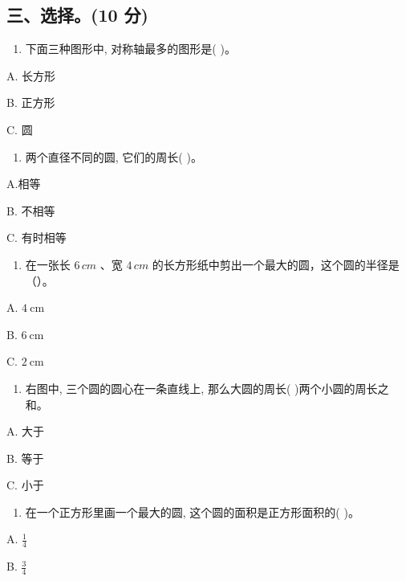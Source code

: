 \documentclass[
  10
]{article}
\providecommand{\tightlist}{%
  \setlength{\itemsep}{0pt}\setlength{\parskip}{0pt}}
\begin{document}
\subsection{三、选择。(10 分)}\label{ux4e09ux9009ux62e910-ux5206}

\begin{enumerate}
\def\labelenumi{\arabic{enumi}.}
\tightlist
\item
  下面三种图形中, 对称轴最多的图形是( )。
\end{enumerate}

A. 长方形

B. 正方形

C. 圆

\begin{enumerate}
\def\labelenumi{\arabic{enumi}.}
\setcounter{enumi}{1}
\tightlist
\item
  两个直径不同的圆, 它们的周长( )。
\end{enumerate}

A.相等

B. 不相等

C. 有时相等

\begin{enumerate}
\def\labelenumi{\arabic{enumi}.}
\setcounter{enumi}{2}
\tightlist
\item
  在一张长 \(6 \, cm\) 、宽 \(4 \, cm\)
  的长方形纸中剪出一个最大的圆，这个圆的半径是（）。
\end{enumerate}

A. \(4 \mathrm{~cm}\)

B. \(6 \mathrm{~cm}\)

C. \(2 \mathrm{~cm}\)

\begin{enumerate}
\def\labelenumi{\arabic{enumi}.}
\setcounter{enumi}{3}
\tightlist
\item
  右图中, 三个圆的圆心在一条直线上, 那么大圆的周长(
  )两个小圆的周长之和。
\end{enumerate}

A. 大于

B. 等于

C. 小于

\begin{enumerate}
\def\labelenumi{\arabic{enumi}.}
\setcounter{enumi}{4}
\tightlist
\item
  在一个正方形里画一个最大的圆, 这个圆的面积是正方形面积的( )。
\end{enumerate}

A. \(\frac{1}{4}\)

B. \(\frac{3}{4}\)
\end{document}
